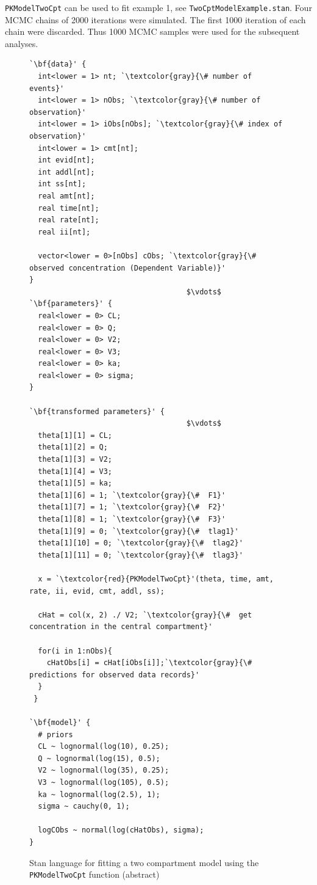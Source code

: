 \documentclass[11pt]{amsart}
\newenvironment{fmpage}[1]
     {\begin{lrbox}{\fmbox}\begin{minipage}{#1}}
     {\end{minipage}\end{lrbox}\fbox{\usebox{\fmbox}}}
\begin{document}
\texttt{PKModelTwoCpt} can be used to fit example 1, see \texttt{TwoCptModelExample.stan}. Four MCMC chains of 2000 iterations were simulated. The first 1000 iteration of each chain were discarded. Thus 1000 MCMC samples were used for the subsequent analyses.

\begin{figure}
\caption{Stan language for fitting a two compartment model using the \texttt{PKModelTwoCpt} function (abstract)}
\begin{center}
\begin{small}
\begin{fmpage}{\textwidth - .75in}
\begin{lstlisting}[basicstyle=\footnotesize\ttfamily,mathescape=true,flexiblecolumns=true,frame=single,escapeinside=`']
`\bf{data}' {
  int<lower = 1> nt; `\textcolor{gray}{\# number of events}'
  int<lower = 1> nObs; `\textcolor{gray}{\# number of observation}'
  int<lower = 1> iObs[nObs]; `\textcolor{gray}{\# index of observation}'
  int<lower = 1> cmt[nt];
  int evid[nt];
  int addl[nt];
  int ss[nt];
  real amt[nt];
  real time[nt];
  real rate[nt];
  real ii[nt];
  
  vector<lower = 0>[nObs] cObs; `\textcolor{gray}{\#  observed concentration (Dependent Variable)}'
}
                                    $\vdots$ 
`\bf{parameters}' {
  real<lower = 0> CL;
  real<lower = 0> Q;
  real<lower = 0> V2;
  real<lower = 0> V3;
  real<lower = 0> ka;
  real<lower = 0> sigma;
}

`\bf{transformed parameters}' {
                                    $\vdots$ 
  theta[1][1] = CL;
  theta[1][2] = Q;
  theta[1][3] = V2;
  theta[1][4] = V3;
  theta[1][5] = ka;
  theta[1][6] = 1; `\textcolor{gray}{\#  F1}'
  theta[1][7] = 1; `\textcolor{gray}{\#  F2}'
  theta[1][8] = 1; `\textcolor{gray}{\#  F3}'
  theta[1][9] = 0; `\textcolor{gray}{\#  tlag1}'
  theta[1][10] = 0; `\textcolor{gray}{\#  tlag2}'
  theta[1][11] = 0; `\textcolor{gray}{\#  tlag3}'

  x = `\textcolor{red}{PKModelTwoCpt}'(theta, time, amt, rate, ii, evid, cmt, addl, ss);

  cHat = col(x, 2) ./ V2; `\textcolor{gray}{\#  get concentration in the central compartment}'

  for(i in 1:nObs){
    cHatObs[i] = cHat[iObs[i]];`\textcolor{gray}{\# predictions for observed data records}'
  }
 }

`\bf{model}' {
  # priors
  CL ~ lognormal(log(10), 0.25);
  Q ~ lognormal(log(15), 0.5);
  V2 ~ lognormal(log(35), 0.25);
  V3 ~ lognormal(log(105), 0.5);
  ka ~ lognormal(log(2.5), 1);
  sigma ~ cauchy(0, 1);

  logCObs ~ normal(log(cHatObs), sigma);
}                                             
\end{lstlisting}
\end{fmpage}
\end{small}
\end{center}
\label{TwoCptCode}
\end{figure}
\end{document}
